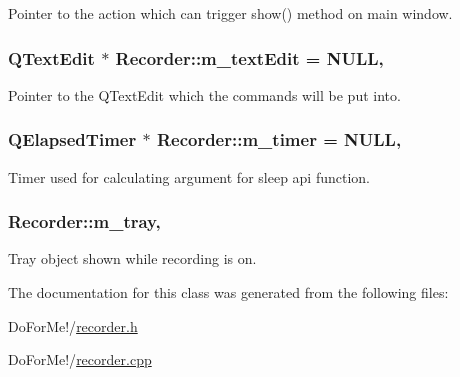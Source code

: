 Pointer to the action which can trigger show() method on main window. 

\hypertarget{class_recorder_a738be0679e1861350cf20e4c7fe0a8af}{
\subsubsection[{m\-\_\-text\-Edit}]{\setlength{\rightskip}{0pt plus 5cm}Q\-Text\-Edit $\ast$ Recorder\-::m\-\_\-text\-Edit = N\-U\-L\-L\hspace{0.3cm}{\ttfamily [static]}, {\ttfamily [private]}}}\label{class_recorder_a738be0679e1861350cf20e4c7fe0a8af}


Pointer to the Q\-Text\-Edit which the commands will be put into. 

\hypertarget{class_recorder_adb205651c105efc4d6a938be11df443f}{
\subsubsection[{m\-\_\-timer}]{\setlength{\rightskip}{0pt plus 5cm}Q\-Elapsed\-Timer $\ast$ Recorder\-::m\-\_\-timer = N\-U\-L\-L\hspace{0.3cm}{\ttfamily [static]}, {\ttfamily [private]}}}\label{class_recorder_adb205651c105efc4d6a938be11df443f}


Timer used for calculating argument for sleep api function. 

\hypertarget{class_recorder_a0377d9a823426d32738d6d8153b59d60}{
\subsubsection[{m\-\_\-tray}]{ Recorder\-::m\-\_\-tray\hspace{0.3cm}{\ttfamily [static]}, {\ttfamily [private]}}}\label{class_recorder_a0377d9a823426d32738d6d8153b59d60}


Tray object shown while recording is on. 



The documentation for this class was generated from the following files\-:\begin{DoxyCompactItemize}
\item 
Do\-For\-Me!/\hyperlink{recorder_8h}{recorder.\-h}\item 
Do\-For\-Me!/\hyperlink{recorder_8cpp}{recorder.\-cpp}\end{DoxyCompactItemize}
